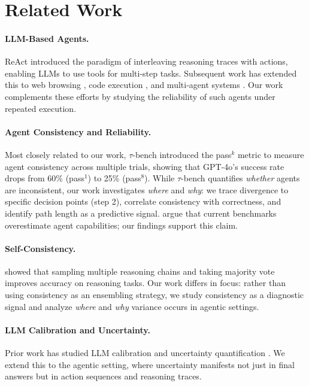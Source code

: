 \documentclass{article}
\begin{document}
\section{Related Work}

\paragraph{LLM-Based Agents.}
ReAct \citep{yao2022react} introduced the paradigm of interleaving reasoning traces with actions, enabling LLMs to use tools for multi-step tasks. Subsequent work has extended this to web browsing \citep{zhou2023webarena}, code execution \citep{yang2024swe}, and multi-agent systems \citep{wu2023autogen}. Our work complements these efforts by studying the reliability of such agents under repeated execution.

\paragraph{Agent Consistency and Reliability.}
Most closely related to our work, $\tau$-bench \citep{yao2024tau} introduced the pass$^k$ metric to measure agent consistency across multiple trials, showing that GPT-4o's success rate drops from 60\% (pass$^1$) to 25\% (pass$^8$). While $\tau$-bench quantifies \emph{whether} agents are inconsistent, our work investigates \emph{where} and \emph{why}: we trace divergence to specific decision points (step 2), correlate consistency with correctness, and identify path length as a predictive signal. \citet{stroebl2024agents} argue that current benchmarks overestimate agent capabilities; our findings support this claim.

\paragraph{Self-Consistency.}
\citet{wang2022self} showed that sampling multiple reasoning chains and taking majority vote improves accuracy on reasoning tasks. Our work differs in focus: rather than using consistency as an ensembling strategy, we study consistency as a diagnostic signal and analyze \emph{where} and \emph{why} variance occurs in agentic settings.

\paragraph{LLM Calibration and Uncertainty.}
Prior work has studied LLM calibration \citep{kadavath2022language} and uncertainty quantification \citep{kuhn2023semantic}. We extend this to the agentic setting, where uncertainty manifests not just in final answers but in action sequences and reasoning traces.
\end{document}

